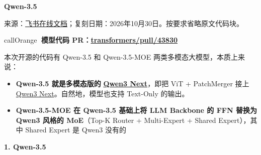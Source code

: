 \documentclass[zihao=false,fontset=windows]{ctexart}
\begin{document}
{\bfseries Qwen-3.5\par}
\begin{feishuquote}来源：\href{https://scnajei2ds6y.feishu.cn/wiki/LZaXwAJi1ij54qkA2SmcGz4Fnmd}{飞书在线文档}；复刻日期：2026年10月30日。按要求省略原文代码块。\end{feishuquote}
\begin{feishubox}{callOrange}{📌}
\textbf{模型代码 PR：}\textbf{\href{https://github.com/huggingface/transformers/pull/43830/files}{transformers/pull/43830}}\par

本次开源的代码有 Qwen-3.5 和 Qwen-3.5-MOE 两类多模态大模型，本质上来说：\par

\begin{itemize}[label=\textcolor{feishuBlue}{\textbullet}]
\item \textcolor{feishuRed}{\textbf{Qwen-3.5 就是多模态版的  }}\textcolor{feishuRed}{\textbf{\href{https://my.feishu.cn/wiki/PWrdwNXobiknnlkf3uKcJLisnmb}{Qwen3 Next}}}，即把 ViT + PatchMerger 接上  \href{https://my.feishu.cn/wiki/PWrdwNXobiknnlkf3uKcJLisnmb}{Qwen3 Next}。自然地，模型也支持 Text-Only 的输出。

\end{itemize}

\begin{itemize}[label=\textcolor{feishuBlue}{\textbullet}]
\item \textcolor{feishuRed}{\textbf{Qwen-3.5-MOE 在 Qwen-3.5 基础上将 LLM Backbone 的 FFN 替换为 Qwen3 风格的 MoE}}（Top-K Router + Multi-Expert + Shared Expert），其中 Shared Expert 是 Qwen3 没有的

\end{itemize}

\end{feishubox}

\Needspace{3cm}\par\vspace{0.9em}\begin{tcolorbox}[enhanced,colback=headRed,boxrule=0pt,arc=4pt,boxsep=0pt,left=3pt,right=3pt,top=2pt,bottom=2pt,before skip=0pt,after skip=3pt]\bfseries \textcolor{feishuBlue}{1.} Qwen-3.5\end{tcolorbox}
\end{document}
